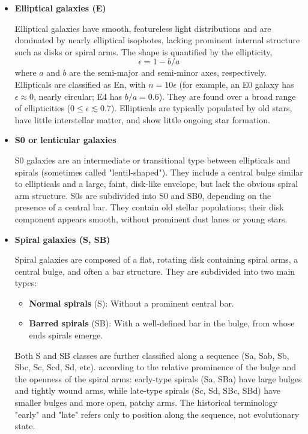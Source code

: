 \begin{itemize}
    \item \textbf{Elliptical galaxies (E)} \par
    Elliptical galaxies have smooth, featureless light distributions and are dominated by nearly elliptical isophotes, lacking prominent internal structure such as disks or spiral arms. The shape is quantified by the ellipticity,
    $$
    \epsilon = 1 - b/a
    $$
    where $a$ and $b$ are the semi-major and semi-minor axes, respectively. Ellipticals are classified as En, with $n = 10 \epsilon$ (for example, an E0 galaxy has $\epsilon \approx 0$, nearly circular; E4 has $b/a = 0.6$). They are found over a broad range of ellipticities ($0 \leq \epsilon \lesssim 0.7$). Ellipticals are typically populated by old stars, have little interstellar matter, and show little ongoing star formation.

    \item \textbf{S0 or lenticular galaxies} \par
    S0 galaxies are an intermediate or transitional type between ellipticals and spirals (sometimes called "lentil-shaped"). They include a central bulge similar to ellipticals and a large, faint, disk-like envelope, but lack the obvious spiral arm structure. S0s are subdivided into S0 and SB0, depending on the presence of a central bar. They contain old stellar populations; their disk component appears smooth, without prominent dust lanes or young stars.

    \item \textbf{Spiral galaxies (S, SB)} \par
    Spiral galaxies are composed of a flat, rotating disk containing spiral arms, a central bulge, and often a bar structure. They are subdivided into two main types:
    \begin{itemize}
        \item \textbf{Normal spirals} (S): Without a prominent central bar.
        \item \textbf{Barred spirals} (SB): With a well-defined bar in the bulge, from whose ends spirals emerge.
    \end{itemize}
    Both S and SB classes are further classified along a sequence (Sa, Sab, Sb, Sbc, Sc, Scd, Sd, etc). according to the relative prominence of the bulge and the openness of the spiral arms: early-type spirals (Sa, SBa) have large bulges and tightly wound arms, while late-type spirals (Sc, Sd, SBc, SBd) have smaller bulges and more open, patchy arms. The historical terminology "early" and "late" refers only to position along the sequence, not evolutionary state.


\end{itemize}
